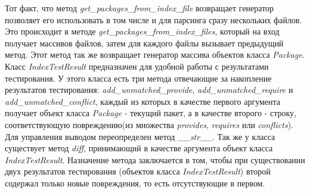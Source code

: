 Тот факт, что метод \textit{get\_packages\_from\_index\_file} возвращает генератор позволяет
его использовать в том числе и для парсинга сразу нескольких файлов. Это происходит
в методе \textit{get\_packages\_from\_index\_files}, который на вход получает массивов файлов, 
затем для каждого файлы вызывает предыдущий метод. Этот метод так же возвращает
генератор массива объектов класса \textit{Package}.\\

Класс \textit{IndexTestResult} предназначен для удобной работы с результатами тестирования. 
У этого класса есть три метода отвечающие за накопление результатов тестирования:
\textit{add\_unmatched\_provide}, \textit{add\_unmatched\_require} и \textit{add\_unmatched\_conflict}, каждый из которых
в качестве первого аргумента получает объект класса \textit{Package} - текущий пакет, а в качестве второго
- строку, соответствующую повреждению(из множества \textit{provides}, \textit{requires} или \textit{conflicts}).
Для управления выводом переопределен метод \textit{\_\_str\_\_}. Так же у класса существует метод \textit{diff},
принимающий в качестве аргумента объект класса \textit{IndexTestResult}. Назначение метода 
заключается в том, чтобы при существовании двух результатов тестирования (объектов
класса \emph{IndexTestResult}) второй содержал только новые повреждения, то есть отсутствующие
в первом.\\

